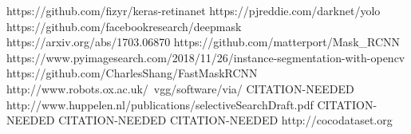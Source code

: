 \begin{thebibliography}{20}%



 https://github.com/fizyr/keras-retinanet
 https://pjreddie.com/darknet/yolo
 https://github.com/facebookresearch/deepmask
 https://arxiv.org/abs/1703.06870
 https://github.com/matterport/Mask\_RCNN
 https://www.pyimagesearch.com/2018/11/26/instance-segmentation-with-opencv
 https://github.com/CharlesShang/FastMaskRCNN
 http://www.robots.ox.ac.uk/~vgg/software/via/
 CITATION-NEEDED
 http://www.huppelen.nl/publications/selectiveSearchDraft.pdf
 CITATION-NEEDED
 CITATION-NEEDED
 CITATION-NEEDED
 http://cocodataset.org

\end{thebibliography}

